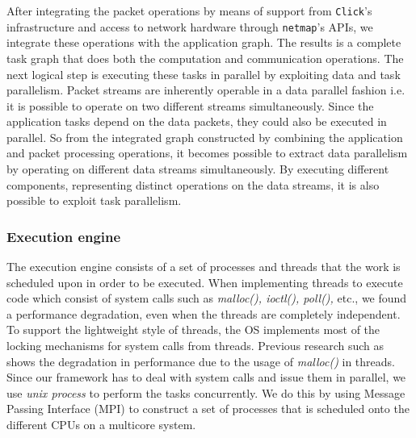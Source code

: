 \documentclass[conference]{IEEEtran}
\begin{document}
After integrating the packet operations by means of support from \texttt{Click}'s infrastructure and access to network hardware through \texttt{netmap}'s APIs, we integrate these operations with the application graph. The results is a complete task graph that does both the computation and communication operations. The next logical step is executing these tasks in parallel by exploiting data and task parallelism. Packet streams are inherently operable in a data parallel fashion i.e. it is possible to operate on two different streams simultaneously. Since the application tasks depend on the data packets, they could also be executed in parallel. So from the integrated graph constructed by combining the application and packet processing operations, it becomes possible to extract data parallelism by operating on different data streams simultaneously. By executing different components, representing distinct operations on the data streams, it is also possible to exploit task parallelism.

\subsubsection{Execution engine}
\label{ppe}

The execution engine consists of a set of processes and threads that the work is scheduled upon in order to be executed. When implementing threads to execute code which consist of system calls such as \textit{malloc(), ioctl(), poll(),} etc., we found a performance degradation, even when the threads are completely independent. To support the lightweight style of threads, the OS implements most of the locking mechanisms for system calls from threads. Previous research such as \cite{Lever:2000:MPM:1267724.1267780} \cite{Dice:2002:MLM:773039.512451} \cite{Michael:2004:SLD:996893.996848} shows the degradation in performance due to the usage of \textit{malloc()} in threads. Since our framework has to deal with system calls and issue them in parallel, we use \textit{unix process} to perform the tasks concurrently. We do this by using Message Passing Interface (MPI) \cite{TheMPIForum:1993:MMP:169627.169855} to construct a set of processes that is scheduled onto the different CPUs on a multicore system.
\end{document}
